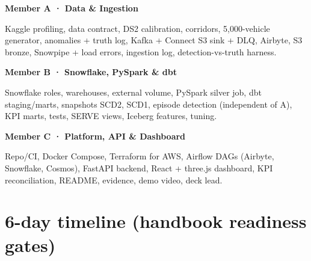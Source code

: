 \documentclass[10pt,a4paper]{article}
\begin{document}
\begin{tcbraster}[raster columns=3, raster equal height, raster column skip=6pt, colback=white, colframe=cardline, boxrule=0.6pt, arc=3pt, left=4pt, right=4pt, top=3pt, bottom=3pt, fontupper=\footnotesize\raggedright]
\begin{tcolorbox}
{\small\bfseries\color{navy}Member A · Data \& Ingestion\par}\vspace{2pt}
Kaggle profiling, data contract, DS2 calibration, corridors, 5,000-vehicle generator, anomalies + truth log, Kafka + Connect S3 sink + DLQ, Airbyte, S3 bronze, Snowpipe + load errors, ingestion log, detection-vs-truth harness.
\end{tcolorbox}
\begin{tcolorbox}
{\small\bfseries\color{navy}Member B · Snowflake, PySpark \& dbt\par}\vspace{2pt}
Snowflake roles, warehouses, external volume, PySpark silver job, dbt staging/marts, snapshots SCD2, SCD1, episode detection (independent of A), KPI marts, tests, SERVE views, Iceberg features, tuning.
\end{tcolorbox}
\begin{tcolorbox}
{\small\bfseries\color{navy}Member C · Platform, API \& Dashboard\par}\vspace{2pt}
Repo/CI, Docker Compose, Terraform for AWS, Airflow DAGs (Airbyte, Snowflake, Cosmos), FastAPI backend, React + three.js dashboard, KPI reconciliation, README, evidence, demo video, deck lead.
\end{tcolorbox}
\end{tcbraster}

\section{6-day timeline (handbook readiness gates)}
\end{document}
